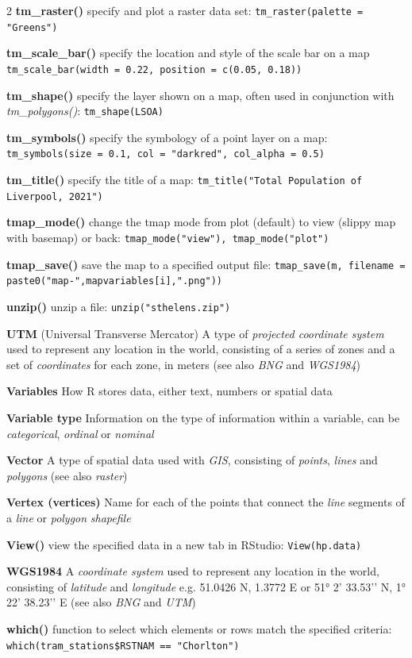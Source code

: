 \documentclass[a4paper,10pt]{article}
\begin{document}
\begin{multicols}{2}
\textbf{tm\_raster()} specify and plot a raster data set: \texttt{tm\_raster(palette = "Greens")}

\textbf{tm\_scale\_bar()} specify the location and style of the scale bar on a map \texttt{tm\_scale\_bar(width = 0.22, position = c(0.05, 0.18))}

\textbf{tm\_shape()} specify the layer shown on a map, often used in conjunction with \textit{tm\_polygons()}: \texttt{tm\_shape(LSOA)}

\textbf{tm\_symbols()} specify the symbology of a point layer on a map: \texttt{tm\_symbols(size = 0.1, col = "darkred", col\_alpha = 0.5)}

\textbf{tm\_title()} specify the title of a map: \texttt{tm\_title("Total Population of Liverpool, 2021")}

\textbf{tmap\_mode()} change the tmap mode from plot (default) to view (slippy map with basemap) or back: \texttt{tmap\_mode("view"),  tmap\_mode("plot")}

\textbf{tmap\_save()} save the map to a specified output file: \texttt{tmap\_save(m, filename = paste0("map-",mapvariables[i],".png"))}

\textbf{unzip()} unzip a file: \texttt{unzip("sthelens.zip")}

\textbf{UTM} (Universal Transverse Mercator) A type of \textit{projected coordinate system} used to represent any location in the world, consisting of a series of zones and a set of \textit{coordinates} for each zone, in meters (see also \textit{BNG} and \textit{WGS1984}) 

\textbf{Variables} How R stores data, either text, numbers or spatial data

\textbf{Variable type} Information on the type of information within a variable, can be \textit{categorical}, \textit{ordinal} or \textit{nominal} 

\textbf{Vector} A type of spatial data used with \textit{GIS}, consisting of \textit{points}, \textit{lines} and \textit{polygons} (see also \textit{raster})

\textbf{Vertex (vertices)} Name for each of the points that connect the \textit{line} segments of a \textit{line} or \textit{polygon} \textit{shapefile}

\textbf{View()} view the specified data in a new tab in RStudio: \texttt{View(hp.data)}

\textbf{WGS1984} A \textit{coordinate system} used to represent any location in the world, consisting of \textit{latitude} and \textit{longitude} e.g. 51.0426 N, 1.3772 E or \ang{51} 2’ 33.53’’ N, \ang{1} 22’ 38.23’’ E (see also \textit{BNG} and \textit{UTM}) 

\textbf{which()} function to select which elements or rows match the specified criteria: \texttt{which(tram\_stations\$RSTNAM == "Chorlton")}

\end{multicols}
\end{document}

